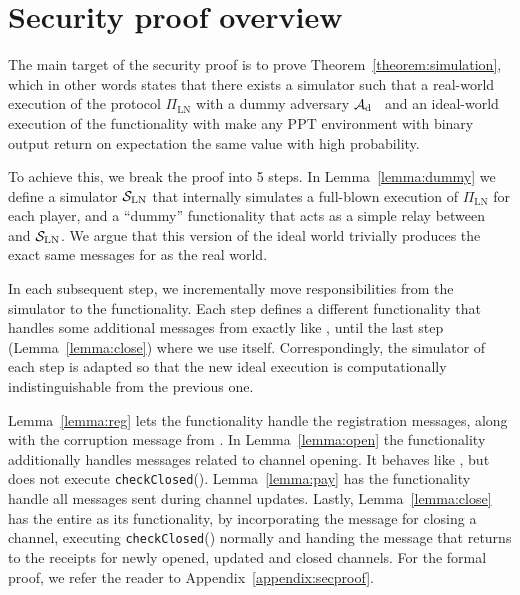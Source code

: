 \section{Security proof overview}
  The main target of the security proof is to prove
  Theorem~\ref{theorem:simulation}, which in other words states that there
  exists a simulator \simulator{} such that a real-world execution of the
  protocol $\Pi_{\mathrm{LN}}$ with a dummy adversary
  $\mathcal{A}_{\mathrm{d}}$~\cite{uc} and an ideal-world execution of the
  functionality \fpaynet{} with \simulator{} make any PPT environment
  \environment{} with binary output return on expectation the same value with
  high probability.

  To achieve this, we break the proof into 5 steps. In Lemma~\ref{lemma:dummy}
  we define a simulator $\mathcal{S}_{\mathrm{LN}}$ that internally simulates a
  full-blown execution of $\Pi_{\mathrm{LN}}$ for each player, and a ``dummy''
  functionality that acts as a simple relay between \environment{} and
  $\mathcal{S}_{\mathrm{LN}}$. We argue that this version of the ideal world
  trivially produces the exact same messages for \environment{} as the real
  world.

  In each subsequent step, we incrementally move responsibilities from the
  simulator to the functionality. Each step defines a different functionality
  that handles some additional messages from \environment{} exactly like
  \fpaynet, until the last step (Lemma~\ref{lemma:close}) where we use
  \fpaynet{} itself. Correspondingly, the simulator of each step is adapted so
  that the new ideal execution is computationally indistinguishable from the
  previous one.

  Lemma~\ref{lemma:reg} lets the functionality handle the registration messages,
  along with the corruption message from \simulator. In Lemma~\ref{lemma:open}
  the functionality additionally handles messages related to channel opening. It
  behaves like \fpaynet, but does not execute \texttt{checkClosed}().
  Lemma~\ref{lemma:pay} has the functionality handle all messages sent during
  channel updates. Lastly, Lemma~\ref{lemma:close} has the entire \fpaynet{} as
  its functionality, by incorporating the message for closing a channel,
  executing \texttt{checkClosed}() normally and handing the message that returns
  to \environment{} the receipts for newly opened, updated and closed channels.
  For the formal proof, we refer the reader to Appendix~\ref{appendix:secproof}.
